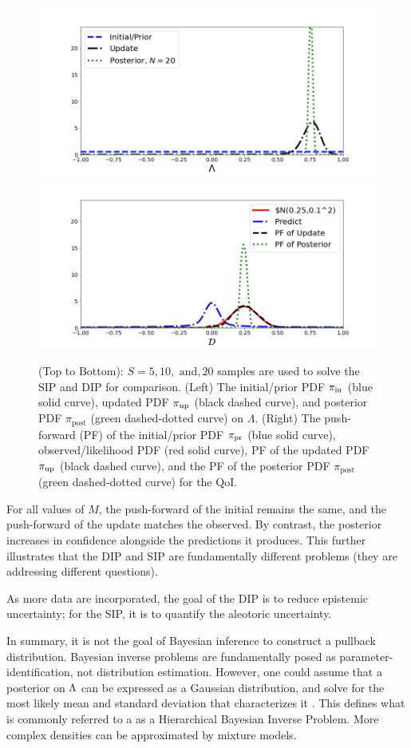 \begin{ex}
\begin{figure}[htbp]
   \includegraphics[width=0.49\linewidth]{figures/bip-vs-sip-20.png}
   \includegraphics[width=0.49\linewidth]{figures/bip-vs-sip-pf-20.png}
 \caption{(Top to Bottom): $S=5, 10, \text{ and}, 20$ samples are used to solve the SIP and DIP for comparison. (Left) The initial/prior PDF $\operatorname*{\pi_{in}}$ (blue solid curve), updated PDF $\operatorname*{\pi_{up}}$ (black dashed curve), and posterior PDF $\pi_\text{post}$ (green dashed-dotted curve) on $\Lambda$.
 (Right) The push-forward (PF) of the initial/prior PDF $\operatorname*{\pi_{pr}}$ (blue solid curve), observed/likelihood PDF (red solid curve), PF of the updated PDF $\operatorname*{\pi_{up}}$ (black dashed curve), and the PF of the posterior PDF $\pi_\text{post}$ (green dashed-dotted curve) for the QoI.}
 \label{fig:bayes-comparison-convergence}
\end{figure}

For all values of $M$, the push-forward of the initial remains the same, and the push-forward of the update matches the observed.
By contrast, the posterior increases in confidence alongside the predictions it produces.
This further illustrates that the DIP and SIP are fundamentally different problems (they are addressing different questions).

As more data are incorporated, the goal of the DIP is to reduce epistemic uncertainty; for the SIP, it is to quantify the aleotoric uncertainty.

\end{ex}





In summary, it is not the goal of Bayesian inference to construct a pullback distribution.
Bayesian inverse problems are fundamentally posed as parameter-identification, not distribution estimation.
However, one could assume that a posterior on ${\Lambda}$ can be expressed as a Gaussian distribution, and solve for the most likely mean and standard deviation that characterizes it \citep{Smith, Tarantola_book}.
This defines what is commonly referred to a as a Hierarchical Bayesian Inverse Problem.
More complex densities can be approximated by mixture models.


